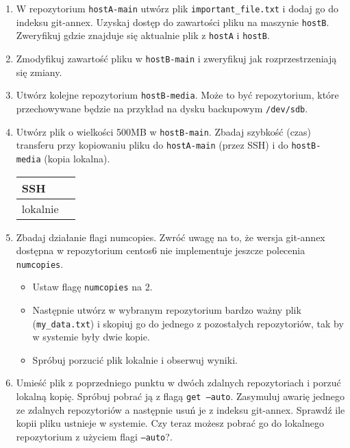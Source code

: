 \documentclass[polish]{article}
\begin{document}
\begin{enumerate}
    \item
    W repozytorium \texttt{hostA-main} utwórz plik \texttt{important\_file.txt}
    i dodaj go do indeksu git-annex. Uzyskaj dostęp do zawartości pliku na
    maszynie \texttt{hostB}. Zweryfikuj gdzie znajduje się aktualnie plik z
    \texttt{hostA} i \texttt{hostB}.

    \item
    Zmodyfikuj zawartość pliku w \texttt{hostB-main} i zweryfikuj jak
    rozprzestrzeniają się zmiany.

    \item
    Utwórz kolejne repozytorium \texttt{hostB-media}. Może to być repozytorium,
    które przechowywane będzie na przykład na dysku backupowym
    \texttt{/dev/sdb}.

    \item
    Utwórz plik o wielkości 500MB w \texttt{hostB-main}. Zbadaj szybkość (czas)
    transferu przy kopiowaniu pliku do \texttt{hostA-main} (przez SSH) i do
    \texttt{hostB-media} (kopia lokalna).

    \begin{tabular}{|l|p{}|}
    \hline
    SSH & \\
    \hline
    lokalnie & \\
    \hline
    \end{tabular}

    \item
    Zbadaj działanie flagi numcopies. Zwróć uwagę na to, że wersja git-annex
    dostępna w repozytorium centos6 nie implementuje jeszcze polecenia
    \texttt{numcopies}.

    \begin{itemize}
        \item Ustaw flagę \texttt{numcopies} na 2.
        \item Następnie utwórz w wybranym repozytorium bardzo ważny plik
              (\texttt{my\_data.txt}) i skopiuj go do jednego z pozostałych
              repozytoriów, tak by w systemie były dwie kopie.
        \item Spróbuj porzucić plik lokalnie i obserwuj wyniki.
    \end{itemize}

    \item
    Umieść plik z poprzedniego punktu w dwóch zdalnych repozytoriach i porzuć
    lokalną kopię. Spróbuj pobrać ją z flagą \texttt{get --auto}. Zasymuluj
    awarię jednego ze zdalnych repozytoriów a następnie usuń je z indeksu
    git-annex. Sprawdź ile kopii pliku ustnieje w systemie. Czy teraz możesz
    pobrać go do lokalnego repozytorium z użyciem flagi \texttt{--auto}?.


\end{enumerate}
\end{document}
